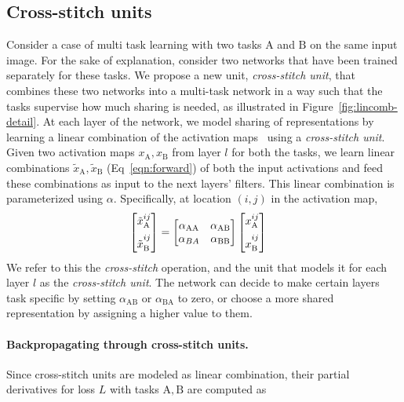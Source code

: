 \documentclass[10pt,twocolumn,letterpaper]{article}
\begin{document}
\subsection{Cross-stitch units}
Consider a case of multi task learning with two tasks $\mathrm{A}$ and $\mathrm{B}$ on the same input image. For the sake of explanation, consider two networks that have been trained separately for these tasks. We propose a new unit, \emph{cross-stitch unit}, that combines these two networks into a multi-task network in a way such that the tasks supervise how much sharing is needed, as illustrated in Figure~\ref{fig:lincomb-detail}. At each layer of the network, we model sharing of representations by learning a linear combination of the activation maps~\cite{whomToShare,argyriou2008convex} using a \emph{cross-stitch unit}. Given two activation maps $x_\mathrm{A}, x_\mathrm{B}$ from layer $l$ for both the tasks, we learn linear combinations $\tilde{x}_\mathrm{A}, \tilde{x}_\mathrm{B}$ (Eq~\ref{eqn:forward}) of both the input activations and feed these combinations as input to the next layers' filters. This linear combination is parameterized using $\alpha$. Specifically, at location $\left(i,j\right)$ in the activation map,
\begin{align}
\label{eqn:forward}
\begin{bmatrix}
\tilde{x}^{ij}_\mathrm{A} \\[2pt]
\tilde{x}^{\strut ij}_\mathrm{B}
\end{bmatrix}
&= \begin{bmatrix}
\alpha_\mathrm{AA}  & \alpha_\mathrm{AB} \\
\alpha_{BA}  & \alpha_\mathrm{BB} \\
\end{bmatrix}
\begin{bmatrix}
x^{ij}_\mathrm{A} \\[2pt]
x^{\strut ij}_\mathrm{B}
\end{bmatrix}
 \end{align}
We refer to this the \emph{cross-stitch} operation, and the unit that models it for each layer $l$ as the \emph{cross-stitch unit}. The network can decide to make certain layers task specific by setting $\alpha_\mathrm{AB}$ or $\alpha_\mathrm{BA}$ to zero, or choose a more shared representation by assigning a higher value to them.

\paragraph{Backpropagating through cross-stitch units.} Since cross-stitch units are modeled as linear combination, their partial derivatives for loss $L$ with tasks $\mathrm{A}, \mathrm{B}$ are computed as
\end{document}
